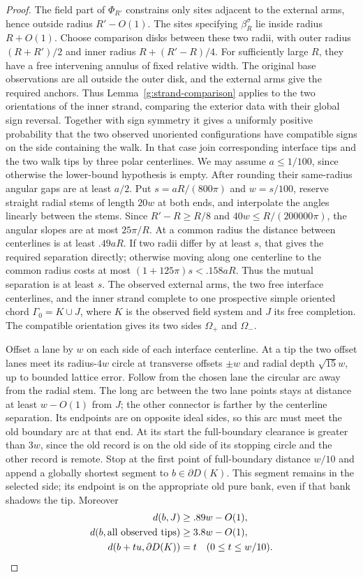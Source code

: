 \begin{proof}
The field part of \(\Phi_{R'}\) constrains only sites adjacent to
the external arms, hence outside radius \(R'-O(1)\).
The sites specifying \(\beta_R^\sigma\) lie inside radius \(R+O(1)\).
Choose comparison disks between these two radii, with
outer radius \((R+R')/2\) and inner radius \(R+(R'-R)/4\).
For sufficiently large \(R\), they have a free intervening annulus
of fixed relative width. The original base observations are all
outside the outer disk, and the external arms give the required
anchors. Thus Lemma~\ref{g:strand-comparison} applies to the two
orientations of the inner strand, comparing the exterior data with
their global sign reversal. Together with sign symmetry it gives a uniformly
positive probability that the two observed unoriented configurations
have compatible signs on the side containing the walk. In that case join corresponding interface tips and the two walk tips by
three polar centerlines.  We may assume \(a\le1/100\), since otherwise
the lower-bound hypothesis is empty.  After rounding their same-radius
angular gaps are at least \(a/2\).  Put
\(s=aR/(800\pi)\) and \(w=s/100\), reserve straight radial stems of
length \(20w\) at both ends, and interpolate the angles linearly between
the stems.  Since \(R'-R\ge R/8\) and \(40w\le R/(200000\pi)\),
the angular slopes are at most \(25\pi/R\).  At a common radius the
distance between centerlines is at least \(.49aR\).  If two radii differ
by at least \(s\), that gives the required separation directly; otherwise
moving along one centerline to the common radius costs at most
\((1+125\pi)s<.158aR\).  Thus the mutual separation is at least \(s\).
The observed external arms, the two free interface centerlines, and the
inner strand complete to one prospective simple oriented chord
\(\Gamma_0=K\cup J\), where \(K\) is the observed field system and
\(J\) its free completion.  The compatible orientation gives its two
sides \(\Omega_+\) and \(\Omega_-\).

Offset a lane by \(w\) on each side of each interface centerline.
At a tip the two offset lanes
meet its radius-\(4w\) circle at transverse offsets \(\pm w\) and
radial depth \(\sqrt{15}w\), up to bounded lattice error.  Follow from
the chosen lane the circular arc away from the radial stem.  The long arc
between the two lane points stays at distance at least \(w-O(1)\) from
\(J\); the other connector is farther by the centerline separation.
Its endpoints are on opposite ideal sides, so this arc must meet the old
boundary arc at that end.  At its start the full-boundary clearance is
greater than \(3w\), since the old record is on the old side of its
stopping circle and the other record is remote.  Stop at the first point
of full-boundary distance \(w/10\) and append a globally shortest segment
to \(b\in\partial D(K)\).  This segment remains in the selected side;
its endpoint is on the appropriate old pure bank, even if that bank
shadows the tip.  Moreover
\[
 \begin{aligned}
 d(b,J)&\ge .89w-O(1),\\
 d(b,\hbox{all observed tips})&\ge3.8w-O(1),\\
 d(b+tu,\partial D(K))&=t\quad(0\le t\le w/10).
 \end{aligned}
\]


\end{proof}
